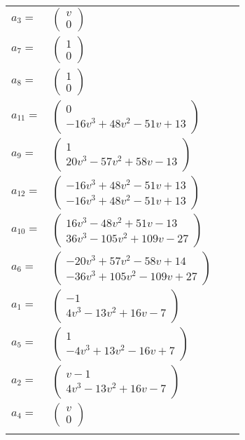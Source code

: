 \documentclass[1p]{elsarticle_modified}
\theoremstyle{definition}
\begin{document}
\begin{tabular}{m{7pt} m{180pt} m{7pt} m{180pt} }
\flushright $a_{3}=$&$\begin{pmatrix}v\\0\end{pmatrix}$ \\
\flushright $a_{7}=$&$\begin{pmatrix}1\\0\end{pmatrix}$ \\
\flushright $a_{8}=$&$\begin{pmatrix}1\\0\end{pmatrix}$ \\
\flushright $a_{11}=$&$\begin{pmatrix}0\\-16 v^3+48 v^2-51 v+13\end{pmatrix}$ \\
\flushright $a_{9}=$&$\begin{pmatrix}1\\20 v^3-57 v^2+58 v-13\end{pmatrix}$ \\
\flushright $a_{12}=$&$\begin{pmatrix}-16 v^3+48 v^2-51 v+13\\-16 v^3+48 v^2-51 v+13\end{pmatrix}$ \\
\flushright $a_{10}=$&$\begin{pmatrix}16 v^3-48 v^2+51 v-13\\36 v^3-105 v^2+109 v-27\end{pmatrix}$ \\
\flushright $a_{6}=$&$\begin{pmatrix}-20 v^3+57 v^2-58 v+14\\-36 v^3+105 v^2-109 v+27\end{pmatrix}$ \\
\flushright $a_{1}=$&$\begin{pmatrix}-1\\4 v^3-13 v^2+16 v-7\end{pmatrix}$ \\
\flushright $a_{5}=$&$\begin{pmatrix}1\\-4 v^3+13 v^2-16 v+7\end{pmatrix}$ \\
\flushright $a_{2}=$&$\begin{pmatrix}v-1\\4 v^3-13 v^2+16 v-7\end{pmatrix}$ \\
\flushright $a_{4}=$&$\begin{pmatrix}v\\0\end{pmatrix}$\\&\end{tabular}
\end{document}
